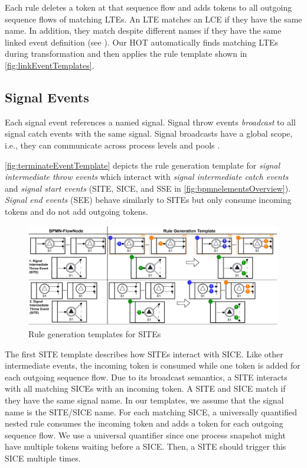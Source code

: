 \documentclass{lmcs} %
\begin{document}
Each rule deletes a token at that sequence flow and adds tokens to all outgoing sequence flows of matching LTEs.
An LTE matches an LCE if they have the same name.
In addition, they match despite different names if they have the same linked event definition (see \cite{objectmanagementgroupBusinessProcessModel2013}).
Our HOT automatically finds matching LTEs during transformation and then applies the rule template shown in \autoref{fig:linkEventTemplates}.

\subsection{Signal Events}
Each signal event references a named signal.
Signal throw events \textit{broadcast} to all signal catch events with the same signal.
Signal broadcasts have a global scope, i.e., they can communicate across process levels and pools \cite{objectmanagementgroupBusinessProcessModel2013}.

\autoref{fig:terminateEventTemplate} depicts the rule generation template for \textit{signal intermediate throw events} which interact with \textit{signal intermediate catch events} and \textit{signal start events} (\textsf{SITE}, \textsf{SICE}, and \textsf{SSE} in \autoref{fig:bpmnelementsOverview}).
\textit{Signal end events} (\textsf{SEE}) behave similarly to SITEs but only consume incoming tokens and do not add outgoing tokens.

\begin{figure}[ht]
    \centering
    \includegraphics[width=1\textwidth]{images/signal_rule_template.pdf}
    \caption{Rule generation templates for SITEs}
    \label{fig:signalEventTemplates}
\end{figure}

The first SITE template describes how SITEs interact with SICE.
Like other intermediate events, the incoming token is consumed while one token is added for each outgoing sequence flow.
Due to its broadcast semantics, a SITE interacts with all matching SICEs with an incoming token.
A SITE and SICE match if they have the same signal name.
In our templates, we assume that the signal name is the SITE/SICE name.
For each matching SICE, a universally quantified nested rule consumes the incoming token and adds a token for each outgoing sequence flow.
We use a universal quantifier since one process snapshot might have multiple tokens waiting before a SICE.
Then, a SITE should trigger this SICE multiple times.
\end{document}
